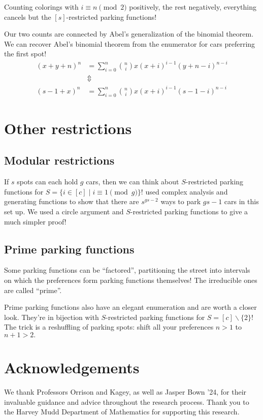 \documentclass[thesis]{hmcposter}
\begin{document}
\begin{poster}
Counting colorings with $i \equiv n \pmod 2$ positively, the rest negatively, everything cancels but the $[s]$-restricted parking functions! 

Our two counts are connected by Abel's generalization of the binomial theorem. We can recover Abel's binomial theorem from the enumerator for cars preferring the first spot!
\begin{align*}
	(x + y + n)^{n} & = \sum_{i = 0}^{n} \binom{n}{i} x (x + i)^{i - 1} (y + n - i)^{n - i} \\
			& \Updownarrow \\
	(s - 1 + x)^{n} & = \sum_{i = 0}^{n} \binom{n}{i} x (x + i)^{i - 1} (s - 1 - i)^{n - i}
\end{align*}

\newcolumn 
\section{Other restrictions}

\subsection{Modular restrictions}

If $s$ spots can each hold $g$ cars, then we can think about $S$-restricted parking functions for $S = \{ i \in [c] \mid i \equiv 1 \pmod g \}$! \cite{blake-konheim-1977} used complex analysis and generating functions to show that there are $s^{gs - 2}$ ways to park $gs - 1$ cars in this set up. We used a circle argument and $S$-restricted parking functions to give a much simpler proof!

\subsection{Prime parking functions}

Some parking functions can be ``factored'', partitioning the street into intervals on which the preferences form parking functions themselves! The irreducible ones are called ``prime''.

Prime parking functions also have an elegant enumeration and are worth a closer look. They're in bijection with $S$-restricted parking functions for $S = [c]\backslash\{2\}$! The trick is a reshuffling of parking spots: shift all your preferences $n>1$ to $n+1>2.$




\vfill

\section{Acknowledgements}

We thank Professors Orrison and Kagey, as well as Jasper Bown '24, for their invaluable guidance and advice throughout the research process. Thank you to the Harvey Mudd Department of Mathematics for supporting this research.

\vfill
\end{poster}
\end{document}
